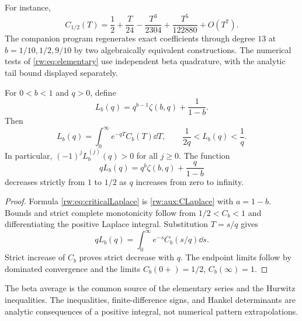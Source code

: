 For instance,
\begin{equation}\label{rw:eq:Cexample}
 C_{1/2}(T)=\frac12+\frac{T}{24}-\frac{T^3}{2304}
                       +\frac{T^5}{122880}+O(T^7).
\end{equation}
The companion program regenerates exact coefficients through degree
$13$ at $b=1/10,1/2,9/10$ by two algebraically equivalent constructions.
The numerical tests of \eqref{rw:eq:elementary} use independent beta
quadrature, with the analytic tail bound displayed separately.

\begin{theorem}
\label{rw:thm:hurwitzcm}
For $0<b<1$ and $q>0$, define
\begin{equation}\label{rw:eq:L}
 L_b(q)=q^{b-1}\zeta(b,q)+\frac1{1-b}.
\end{equation}
Then
\begin{equation}\label{rw:eq:criticalLaplace}
 L_b(q)=\int_0^\infty e^{-qT}C_b(T)\dd T,
 \qquad \frac1{2q}<L_b(q)<\frac1q.
\end{equation}
In particular, $(-1)^jL_b^{(j)}(q)>0$ for all $j\ge0$.
The function
\begin{equation}\label{rw:eq:normalizedHurwitz}
 qL_b(q)=q^b\zeta(b,q)+\frac q{1-b}
\end{equation}
decreases strictly from $1$ to $1/2$ as $q$ increases from zero to
infinity.
\end{theorem}
\begin{proof}
Formula \eqref{rw:eq:criticalLaplace} is \eqref{rw:aux:CLaplace} with
$a=1-b$. Bounds and strict complete monotonicity follow from
$1/2<C_b<1$ and differentiating the positive Laplace integral.
Substitution $T=s/q$ gives
\[
 qL_b(q)=\int_0^\infty e^{-s}C_b(s/q)\dd s.
\]
Strict increase of $C_b$ proves strict decrease with $q$.
The endpoint limits follow by dominated convergence and the limits
$C_b(0+)=1/2$, $C_b(\infty)=1$.
\end{proof}

The beta average is the common source of the elementary series and
the Hurwitz inequalities. The inequalities, finite-difference signs,
and Hankel determinants are analytic consequences of a positive
integral, not numerical pattern extrapolations.
